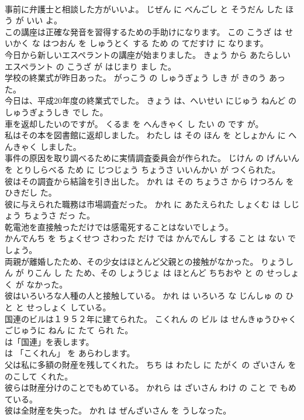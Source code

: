 \documentclass[8pt]{extreport}
\begin{document}
\begin{CJK}{UTF8}{min}
\\	事前に弁護士と相談した方がいいよ。	じぜん に べんごし と そうだん した ほう が いい よ。	
\\	この講座は正確な発音を習得するための手助けになります。	この こうざ は せいかく な はつおん を しゅうとく する ため の てだすけ に なります。	
\\	今日から新しいエスペラントの講座が始まりました。	きょう から あたらしい エスペラント の こうざ が はじまり まし た。	
\\	学校の終業式が昨日あった。	がっこう の しゅうぎょう しき が きのう あった。	
\\	今日は、平成20年度の終業式でした。	きょう は、へいせい にじゅう ねんど の しゅうぎょうしき でし た。	
\\	車を返却したいのですが。	くるま を へんきゃく し たい の です が。	
\\	私はその本を図書館に返却しました。	わたし は その ほん を としょかん に へんきゃく しました。	
\\	事件の原因を取り調べるために実情調査委員会が作られた。	じけん の げんいん を とりしらべる ため に じつじょう ちょうさ いいんかい が つくられた。	
\\	彼はその調査から結論を引き出した。	かれ は その ちょうさ から けつろん を ひきだし た。	
\\	彼に与えられた職務は市場調査だった。	かれ に あたえられた しょくむ は しじょう ちょうさ だっ た。	
\\	乾電池を直接触っただけでは感電死することはないでしょう。	
\\	かんでんち を ちょくせつ さわった だけ では かんでんし する こと は ない でしょう。	
\\	両親が離婚したため、その少女はほとんど父親との接触がなかった。	りょうしん が りこん し た ため、その しょうじょ は ほとんど ちちおや と の せっしょく が なかった。	
\\	彼はいろいろな人種の人と接触している。	かれ は いろいろ な じんしゅ の ひと と せっしょく している。	
\\	国連のビルは１９５２年に建てられた。	こくれん の ビル は せんきゅうひゃくごじゅうに ねん に たて られ た。	
\\	は「国連」を表します。	
\\	は 「こくれん」 を あらわします。	
\\	父は私に多額の財産を残してくれた。	ちち は わたし に たがく の ざいさん を のこして くれた。	
\\	彼らは財産分けのことでもめている。	かれら は ざいさん わけ の こと で もめている。	
\\	彼は全財産を失った。	かれ は ぜんざいさん を うしなった。	

\end{CJK}
\end{document}
